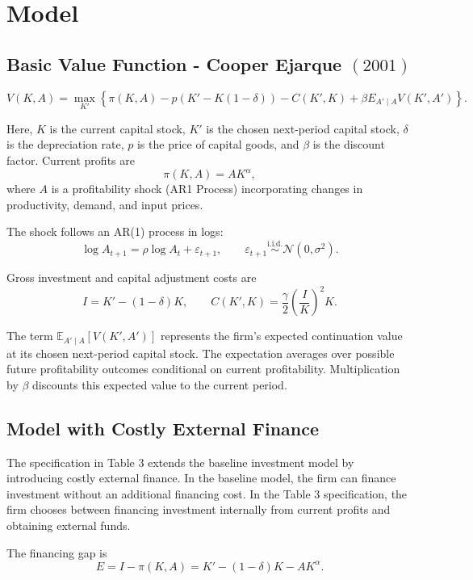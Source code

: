 \documentclass{article}
\begin{document}
\section{Model}

\subsection{Basic Value Function - Cooper Ejarque $(2001)$}
\begin{equation}
V(K,A)
=
\max_{K'}
\left\{
\pi(K,A)
- p\left(K' - K(1-\delta)\right)
- C(K',K)
+ \beta E_{A' \mid A} V(K',A')
\right\}.
\end{equation}

Here, $K$ is the current capital stock, $K'$ is the chosen
next-period capital stock, $\delta$ is the depreciation rate,
$p$ is the price of capital goods, and $\beta$ is the discount
factor. Current profits are
\[
\pi(K,A)=AK^\alpha,
\]
where $A$ is a profitability shock (AR1 Process) incorporating changes in
productivity, demand, and input prices.

The shock follows an AR(1) process in logs:
\[
\log A_{t+1}
=
\rho \log A_t+\varepsilon_{t+1},
\qquad
\varepsilon_{t+1}\overset{\mathrm{i.i.d.}}{\sim}
\mathcal{N}(0,\sigma^2).
\]



Gross investment and capital adjustment costs are
\[
I=K'-(1-\delta)K,
\qquad
C(K',K)=\frac{\gamma}{2}\left(\frac{I}{K}\right)^2 K.
\]

The term $\mathbb{E}_{A'\mid A}[V(K',A')]$ represents the firm's
expected continuation value at its chosen next-period capital
stock. The expectation averages over possible future profitability
outcomes conditional on current profitability. Multiplication
by $\beta$ discounts this expected value to the current period.

\subsection{Model with Costly External Finance}

The specification in Table 3 extends the baseline investment model
by introducing costly external finance. In the baseline model, the
firm can finance investment without an additional financing cost.
In the Table 3 specification, the firm chooses between financing
investment internally from current profits and obtaining external
funds.


The financing gap is
\[
E=I-\pi(K,A)
=K'-(1-\delta)K-AK^\alpha.
\]
\end{document}
